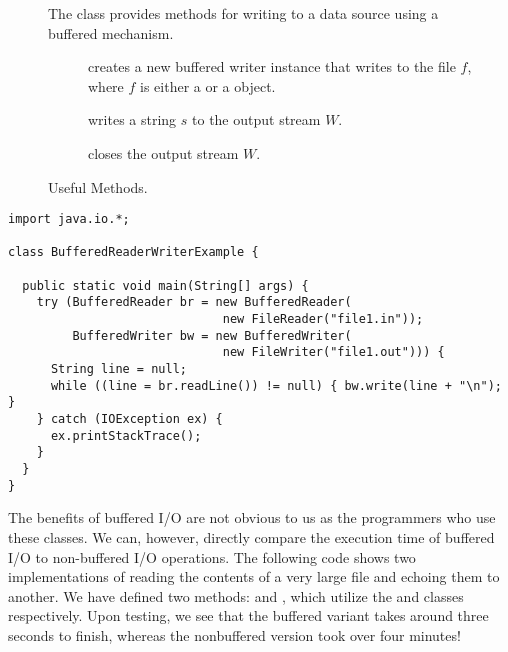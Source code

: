 \begin{figure}[tp]
  \small
  \begin{tcolorbox}[title=BufferedWriter Methods]
    The  class provides methods for writing to a data source using a buffered mechanism.
    \vspace{2ex}
  \begin{description}
    \item [] creates a new buffered writer instance that writes to the file $f$, where $f$ is either a  or a  object.
    \item [] writes a string $s$ to the output stream $W$.
    \item [] closes the output stream $W$.
  \end{description}
\end{tcolorbox}
  \caption{Useful  Methods.}
  \label{fig:bw}
\end{figure}


\begin{lstlisting}[language=MyJava]
import java.io.*;

class BufferedReaderWriterExample {

  public static void main(String[] args) {
    try (BufferedReader br = new BufferedReader(
                              new FileReader("file1.in"));
         BufferedWriter bw = new BufferedWriter(
                              new FileWriter("file1.out"))) {
      String line = null;
      while ((line = br.readLine()) != null) { bw.write(line + "\n"); }
    } catch (IOException ex) {
      ex.printStackTrace();
    }
  }
}
\end{lstlisting}

The benefits of buffered I/O are not obvious to us as the programmers who use these classes. 
We can, however, directly compare the execution time of buffered I/O to non-buffered I/O operations. 
The following code shows two implementations of reading the contents of a very large file and echoing them to another. 
We have defined two methods:  and , which utilize the  and  classes respectively. 
Upon testing, we see that the buffered variant takes around three seconds to finish, whereas the nonbuffered version took over four minutes!

